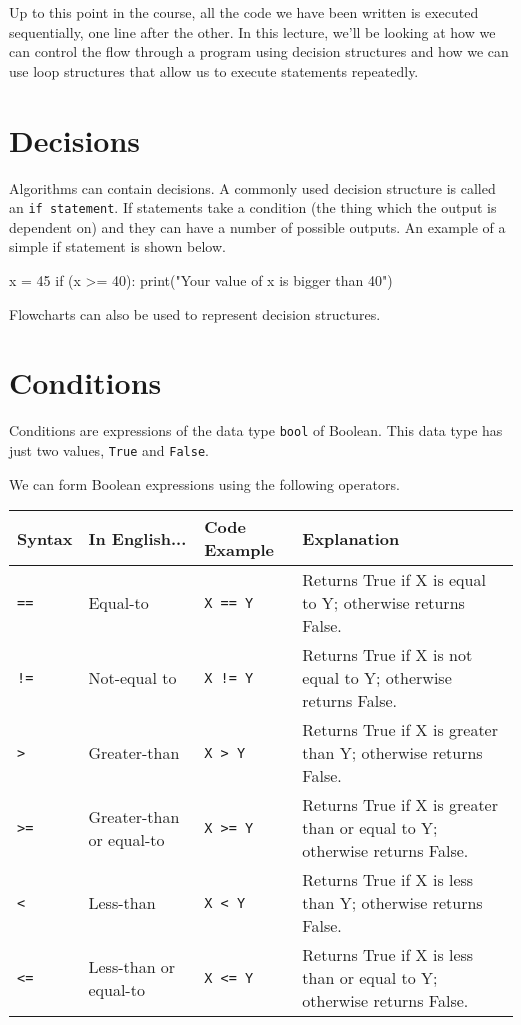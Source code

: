 
Up to this point in the course, all the code we have been written is executed sequentially, one line after the other. In this lecture, we'll be looking at how we can control the flow through a program using decision structures and how we can use loop structures that allow us to execute statements repeatedly.

\section*{Decisions}
Algorithms can contain decisions. A commonly used decision structure is called an \texttt{if statement}. If statements take a condition (the thing which the output is dependent on) and they can have a number of possible outputs. An example of a simple if statement is shown below.
\begin{python}
x = 45
if (x >= 40):
    print("Your value of x is bigger than 40")
\end{python}
Flowcharts can also be used to represent decision structures.

\section*{Conditions}
Conditions are expressions of the data type \texttt{bool} of Boolean. This data type has just two values, \texttt{True} and \texttt{False}. 

We can form Boolean expressions using the following operators.
\begin{table}[H]
    \centering
    \begin{tabularx}{0.9\textwidth}{|X|X|X|X|}
        \hline
        \textbf{Syntax} & \textbf{In English...} & \textbf{Code Example} & \textbf{Explanation}\\
        \hline
        \verb|==| & Equal-to & \verb|X == Y| & Returns True if X is equal to Y; otherwise returns False.\\
        \hline
        \verb|!=| & Not-equal to & \verb|X != Y| & Returns True if X is not equal to Y; otherwise returns False.\\
        \hline
        \verb|>| & Greater-than & \verb|X > Y| & Returns True if X is greater than Y; otherwise returns False. \\
        \hline
        \verb|>=| & Greater-than or equal-to & \verb|X >= Y| & Returns True if X is greater than or equal to Y; otherwise returns False. \\
        \hline
        \verb|<| & Less-than & \verb|X < Y|  & Returns True if X is less than Y; otherwise returns False. \\
        \hline
        \verb|<=| & Less-than or equal-to & \verb|X <= Y| & Returns True if X is less than or equal to Y; otherwise returns False.\\
        \hline
    \end{tabularx}
\end{table}

